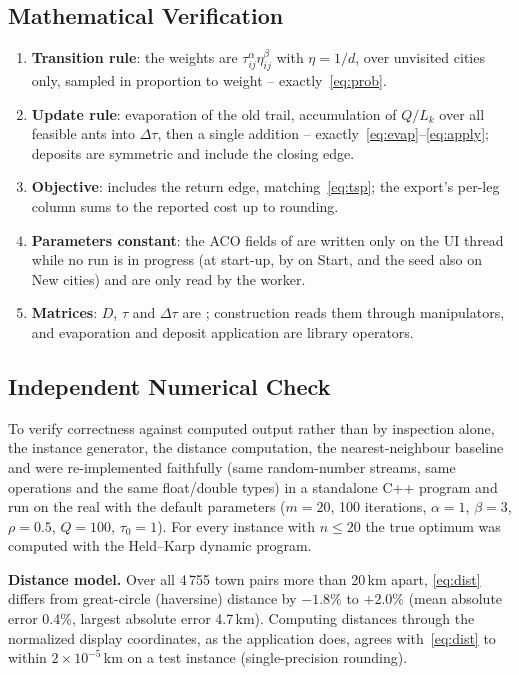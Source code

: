 \documentclass[11pt,a4paper]{article}
\begin{document}
\subsection{Mathematical Verification}
\begin{enumerate}
  \item \textbf{Transition rule}: the weights are $\tau_{ij}^{\alpha}\eta_{ij}^{\beta}$ with $\eta=1/d$, over unvisited
        cities only, sampled in proportion to weight -- exactly~\eqref{eq:prob}.
  \item \textbf{Update rule}: evaporation of the old trail, accumulation of $Q/L_k$ over all feasible ants
        into $\Delta\tau$, then a single addition -- exactly~\eqref{eq:evap}--\eqref{eq:apply}; deposits are
        symmetric and include the closing edge.
  \item \textbf{Objective}:  includes the return edge, matching~\eqref{eq:tsp}; the export's
        per-leg column sums to the reported cost up to rounding.
  \item \textbf{Parameters constant}: the ACO fields of  are written only on the UI
        thread while no run is in progress (at start-up, by  on Start, and the seed
        also on New cities) and are only read by the worker.
  \item \textbf{Matrices}: $D$, $\tau$ and $\Delta\tau$ are ; construction reads them through
        manipulators, and evaporation and deposit application are library operators.
\end{enumerate}

\subsection{Independent Numerical Check}\label{sec:numcheck}
To verify correctness against computed output rather than by inspection alone, the instance generator,
the distance computation, the nearest-neighbour baseline and  were re-implemented
faithfully (same random-number streams, same operations and the same float/double types) in a standalone C++ program and run on the real  with the default parameters ($m=20$, 100
iterations, $\alpha=1$, $\beta=3$, $\rho=0.5$, $Q=100$, $\tau_0=1$). For every instance with $n\le20$ the true optimum
was computed with the Held--Karp dynamic program.

\textbf{Distance model.} Over all 4\,755 town pairs more than 20\,km apart, \eqref{eq:dist} differs from
great-circle (haversine) distance by $-1.8\%$ to $+2.0\%$ (mean absolute error 0.4\%, largest absolute
error 4.7\,km). Computing distances through the normalized display coordinates, as the application does,
agrees with~\eqref{eq:dist} to within $2\times10^{-5}$\,km on a test instance (single-precision rounding).
\end{document}
